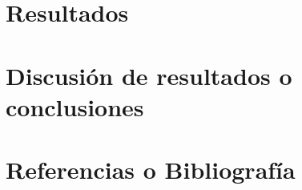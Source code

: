 \documentclass[a4paper, 10pt]{article}
\begin{document}
\clearpage

\section{Resultados}



\clearpage

\section{Discusión de resultados o conclusiones}



\clearpage

\section{Referencias o Bibliografía}



\clearpage
\end{document}
